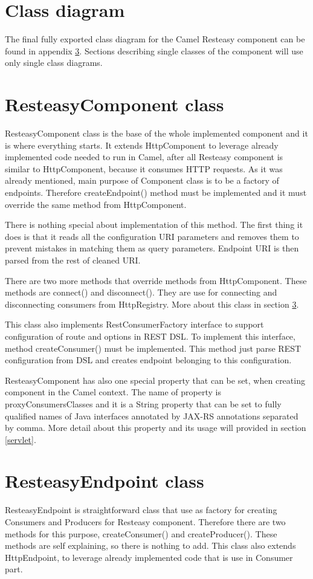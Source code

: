 \documentclass[12pt,final,oneside]{fithesis2}
\begin{document}
\section{Class diagram}
The final fully exported class diagram for the Camel Resteasy component can be found in appendix \ref{}. Sections describing single classes of the component will use only single class diagrams.

\section{ResteasyComponent class}
ResteasyComponent class is the base of the whole implemented component and it is where everything starts. It extends HttpComponent to leverage already implemented code needed to run in Camel, after all Resteasy component is similar to HttpComponent, because it consumes HTTP requests. As it was already mentioned, main purpose of Component class is to be a factory of endpoints. Therefore createEndpoint() method must be implemented and it must override the same method from HttpComponent.

There is nothing special about implementation of this method. The first thing it does is that it reads all the configuration URI parameters and removes them to prevent mistakes in matching them as query parameters. Endpoint URI is then parsed from the rest of cleaned URI.

There are two more methods that override methods from HttpComponent. These methods are connect() and disconnect(). They are use for connecting and disconnecting consumers from HttpRegistry. More about this class in section \ref{}. 

This class also implements RestConsumerFactory interface to support configuration of route and options in REST DSL. To implement this interface, method createConsumer() must be implemented. This method just parse REST configuration from DSL and creates endpoint belonging to this configuration.

ResteasyComponent has also one special property that can be set, when creating component in the Camel context. The name of property is proxyConsumersClasses and it is a String property that can be set to fully qualified names of Java interfaces annotated by JAX-RS annotations separated by comma. More detail about this property and its usage will provided in section \ref{servlet}.

\section{ResteasyEndpoint class}
ResteasyEndpoint is straightforward class that use as factory for creating Consumers and Producers for Resteasy component. Therefore there are two methods for this purpose, createConsumer() and createProducer(). These methods are self explaining, so there is nothing to add. This class also extends HttpEndpoint, to leverage already implemented code that is use in Consumer part.
\end{document}
